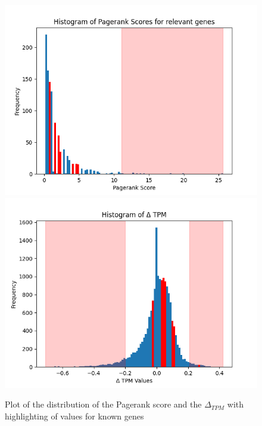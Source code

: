 \begin{figure}[h]
        \includegraphics[width=\linewidth]{figures/05_01_pagerank_known_genes}
    \endminipage
    \hfill
      \includegraphics[width=\linewidth]{figures/05_01_delta_tpm_relevant}
    \endminipage
    \caption{Plot of the distribution of the Pagerank score and the $\Delta_{TPM}$ with highlighting of values for known genes}
    \label{fig:05_known_genes}
\end{figure}










